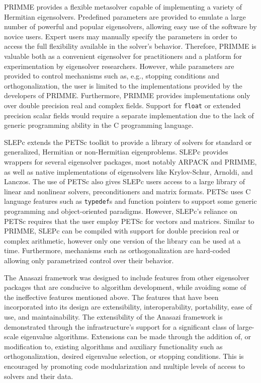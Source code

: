 \documentclass[acmtoms]{acmtrans2m}
\newcounter{algorithm}
\begin{document}
PRIMME provides a flexible metasolver capable of implementing a variety of
Hermitian eigensolvers. Predefined parameters are provided to emulate a large number of powerful 
and popular eigensolvers, allowing easy use of the software by novice users. Expert users may
manually specify the parameters in order to access the full flexibility available in the
solver's behavior. Therefore, PRIMME is valuable both as a convenient eigensolver for
practitioners and a platform for experimentation by eigensolver researchers. However,
while parameters are provided to control mechanisms such as, e.g., stopping conditions and
orthogonalization, the user is limited to the implementations provided by the developers of
PRIMME.  Furthermore, PRIMME provides implementations only over double precision real and complex
fields.  Support for \texttt{float} or extended precision scalar fields would require a separate
implementation due to the lack of generic programming ability in the C programming
language.

SLEPc extends the PETSc toolkit to provide a library of solvers for standard or
generalized, Hermitian or non-Hermitian eigenproblems.
SLEPc provides wrappers for several eigensolver packages, most notably ARPACK and PRIMME,
as well as native implementations of eigensolvers like Krylov-Schur, Arnoldi, and Lanczos.
The use of PETSc also gives SLEPc users access to a large library of linear and nonlinear 
solvers, preconditioners and matrix formats. PETSc uses C language features such as 
\texttt{typedef}s and function pointers to support some generic programming and object-oriented 
paradigms. However, SLEPc's reliance on PETSc requires that the user employ PETSc for vectors 
and matrices. Similar to PRIMME, SLEPc can be compiled with support for double precision
real or complex arithmetic, however only one version of the library can be used at a time.
Furthermore, mechanisms such as orthogonalization are hard-coded allowing only parametrized 
control over their behavior. 

The Anasazi framework was designed to include features from other eigensolver packages that
are conducive to algorithm development, while avoiding some of the ineffective features mentioned above.
The features that have been incorporated into its design are extensibility, interoperability,
portability, ease of use, and maintainability. The extensibility of the Anasazi framework is demonstrated
through the infrastructure's support for a significant class of large-scale eigenvalue algorithms. 
Extensions can be made through the addition of, or modification to, existing algorithms and auxiliary
functionality such as orthogonalization, desired eigenvalue selection, or stopping conditions. 
This is encouraged by promoting code modularization and multiple levels of access to solvers and
their data. 
\end{document}
